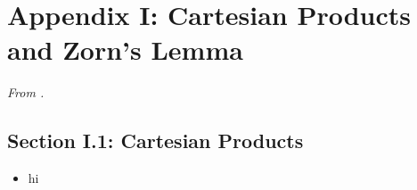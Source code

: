\documentclass[../notes.tex]{subfiles}
\begin{document}
\section{Appendix I: Cartesian Products and Zorn's Lemma}
\emph{From \textcite{bib:DummitFoote}.}
\setcounter{bookch}{1}
\renewcommand{\thebookch}{\Roman{bookch}}
\subsection*{Section I.1: Cartesian Products}
\begin{itemize}
    \item hi
\end{itemize}
\renewcommand{\thebookch}{\arabic{bookch}}
\setcounter{proposition}{0}
\end{document}
